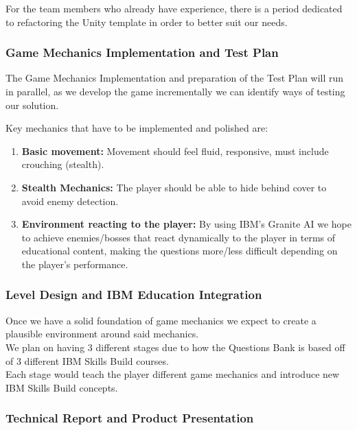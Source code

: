 \documentclass[11pt, a4paper]{article}
\begin{document}
\noindent For the team members who already have experience, there is a period dedicated to refactoring the Unity template in order to better suit our needs.

\newpage

\subsubsection{Game Mechanics Implementation and Test Plan}

\noindent The Game Mechanics Implementation and preparation of the Test Plan will run in parallel, as we develop the game incrementally we can identify ways of testing our solution.

\noindent Key mechanics that have to be implemented and polished are:

\begin{enumerate}
    \item \textbf{Basic movement:} Movement should feel fluid, responsive, must include crouching (stealth).

    \item \textbf{Stealth Mechanics:} The player should be able to hide behind cover to avoid enemy detection.

    \item \textbf{Environment reacting to the player:} By using IBM's Granite AI we hope to achieve enemies/bosses that react dynamically to the player in terms of educational content, making the questions more/less difficult depending on the player's performance.
\end{enumerate}

\subsubsection{Level Design and IBM Education Integration}

\noindent Once we have a solid foundation of game mechanics we expect to create a plausible environment around said mechanics. \\

\noindent We plan on having 3 different stages due to how the Questions Bank is based off of 3 different IBM Skills Build courses. \\

\noindent Each stage would teach the player different game mechanics and introduce new IBM Skills Build concepts.

\subsubsection{Technical Report and Product Presentation}
\end{document}
